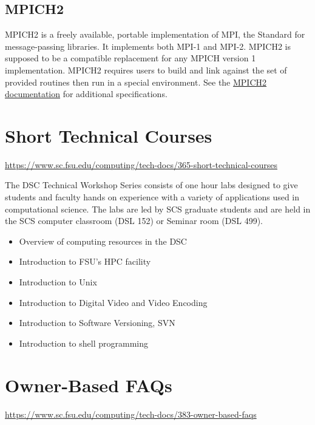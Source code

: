 \documentclass[12pt,a4paper]{article}
\begin{document}
\subsection*{MPICH2}
MPICH2 is a freely available, portable implementation of MPI, the Standard for message-passing libraries. It implements both MPI-1 and MPI-2. MPICH2 is supposed to be a compatible replacement for any MPICH version 1 implementation. MPICH2 requires users to build and link against the set of provided routines then run in a special environment. See the \href{https://www.mpich.org/documentation/guides/}{MPICH2 documentation} for additional specifications.

\section{Short Technical Courses}
\url{https://www.sc.fsu.edu/computing/tech-docs/365-short-technical-courses}

The DSC Technical Workshop Series consists of one hour labs designed to
give students and faculty hands on experience with a variety of
applications used in computational science. The labs are led by SCS
graduate students and are held in the SCS computer classroom (DSL 152)
or Seminar room (DSL 499).
\begin{itemize}
    \item Overview of computing resources in the DSC
    \item Introduction to FSU's HPC facility
    \item Introduction to Unix
    \item Introduction to Digital Video and Video Encoding
    \item Introduction to Software Versioning, SVN
    \item Introduction to shell programming
\end{itemize}

\section{Owner-Based FAQs}
\url{https://www.sc.fsu.edu/computing/tech-docs/383-owner-based-faqs}
\end{document}
